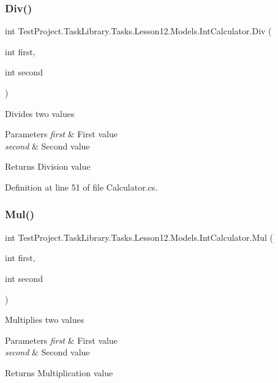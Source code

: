 \subsubsection{\texorpdfstring{Div()}{Div()}}
{\footnotesize\ttfamily int Test\+Project.\+Task\+Library.\+Tasks.\+Lesson12.\+Models.\+Int\+Calculator.\+Div (\begin{DoxyParamCaption}\item[{int}]{first,  }\item[{int}]{second }\end{DoxyParamCaption})}



Divides two values 


\begin{DoxyParams}{Parameters}
{\em first} & First value\\
\hline
{\em second} & Second value\\
\hline
\end{DoxyParams}
\begin{DoxyReturn}{Returns}
Division value
\end{DoxyReturn}


Definition at line 51 of file Calculator.\+cs.

\mbox{\label{class_test_project_1_1_task_library_1_1_tasks_1_1_lesson12_1_1_models_1_1_int_calculator_a08161bda29271303d54e1d5265e751ed}} 
\subsubsection{\texorpdfstring{Mul()}{Mul()}}
{\footnotesize\ttfamily int Test\+Project.\+Task\+Library.\+Tasks.\+Lesson12.\+Models.\+Int\+Calculator.\+Mul (\begin{DoxyParamCaption}\item[{int}]{first,  }\item[{int}]{second }\end{DoxyParamCaption})}



Multiplies two values 


\begin{DoxyParams}{Parameters}
{\em first} & First value\\
\hline
{\em second} & Second value\\
\hline
\end{DoxyParams}
\begin{DoxyReturn}{Returns}
Multiplication value
\end{DoxyReturn}


